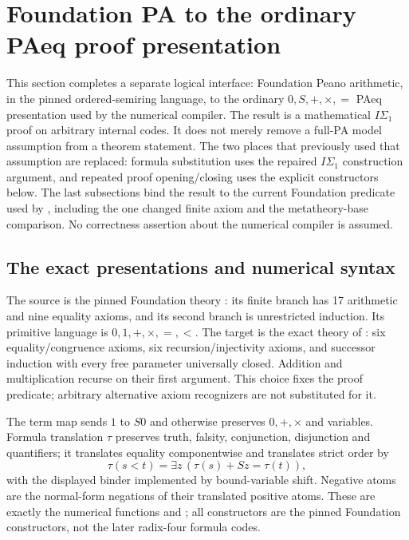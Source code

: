 \section{Foundation PA to the ordinary PAeq proof presentation}
\label{sec:foundation-paeq-complete}

This section completes a separate logical interface: Foundation
Peano arithmetic, in the pinned ordered-semiring language, to the ordinary
$0,S,+,\times,=$ PAeq presentation used by the numerical compiler.
The result is a mathematical $I\Sigma_1$ proof on arbitrary internal
codes.  It does not merely remove a full-PA model assumption from a theorem
statement.  The two places that previously used that assumption are
replaced: formula substitution uses the repaired $I\Sigma_1$ construction
argument, and repeated proof opening/closing uses the explicit constructors
below.  The last subsections bind the result to the current Foundation
predicate used by , including the one changed
finite axiom and the metatheory-base comparison.  No correctness assertion
about the numerical compiler is assumed.

\subsection{The exact presentations and numerical syntax}

The source is the pinned Foundation theory : its finite
 branch has 17 arithmetic and nine equality axioms,
and its second branch is unrestricted induction.  Its primitive language
is $0,1,+,\times,=,<$.  The target is the exact theory
 of
: six equality/congruence axioms,
six recursion/injectivity axioms, and successor induction with every free
parameter universally closed.  Addition and multiplication recurse on
their first argument.  This choice fixes the proof predicate; arbitrary
alternative axiom recognizers are not substituted for it.

The term map sends $1$ to $S0$ and otherwise preserves $0,+,\times$ and
variables.  Formula translation $\tau$ preserves truth, falsity,
conjunction, disjunction and quantifiers; it translates equality
componentwise and translates strict order by
\[
 \tau(s<t)=\exists z\,(\tau(s)+S z=\tau(t)),
\]
with the displayed binder implemented by bound-variable shift.
Negative atoms are the normal-form negations of their translated positive
atoms.  These are exactly the numerical functions  and
; all constructors are the pinned Foundation
constructors, not the later radix-four formula codes.


